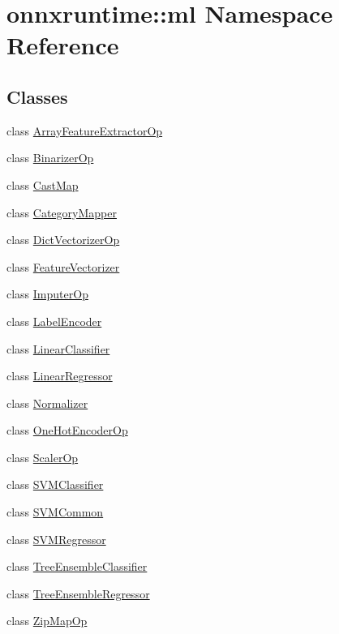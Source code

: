 \hypertarget{namespaceonnxruntime_1_1ml}{}\section{onnxruntime\+:\+:ml Namespace Reference}
\label{namespaceonnxruntime_1_1ml}
\subsection*{Classes}
\begin{DoxyCompactItemize}
\item 
class \mbox{\hyperlink{classonnxruntime_1_1ml_1_1ArrayFeatureExtractorOp}{Array\+Feature\+Extractor\+Op}}
\item 
class \mbox{\hyperlink{classonnxruntime_1_1ml_1_1BinarizerOp}{Binarizer\+Op}}
\item 
class \mbox{\hyperlink{classonnxruntime_1_1ml_1_1CastMap}{Cast\+Map}}
\item 
class \mbox{\hyperlink{classonnxruntime_1_1ml_1_1CategoryMapper}{Category\+Mapper}}
\item 
class \mbox{\hyperlink{classonnxruntime_1_1ml_1_1DictVectorizerOp}{Dict\+Vectorizer\+Op}}
\item 
class \mbox{\hyperlink{classonnxruntime_1_1ml_1_1FeatureVectorizer}{Feature\+Vectorizer}}
\item 
class \mbox{\hyperlink{classonnxruntime_1_1ml_1_1ImputerOp}{Imputer\+Op}}
\item 
class \mbox{\hyperlink{classonnxruntime_1_1ml_1_1LabelEncoder}{Label\+Encoder}}
\item 
class \mbox{\hyperlink{classonnxruntime_1_1ml_1_1LinearClassifier}{Linear\+Classifier}}
\item 
class \mbox{\hyperlink{classonnxruntime_1_1ml_1_1LinearRegressor}{Linear\+Regressor}}
\item 
class \mbox{\hyperlink{classonnxruntime_1_1ml_1_1Normalizer}{Normalizer}}
\item 
class \mbox{\hyperlink{classonnxruntime_1_1ml_1_1OneHotEncoderOp}{One\+Hot\+Encoder\+Op}}
\item 
class \mbox{\hyperlink{classonnxruntime_1_1ml_1_1ScalerOp}{Scaler\+Op}}
\item 
class \mbox{\hyperlink{classonnxruntime_1_1ml_1_1SVMClassifier}{S\+V\+M\+Classifier}}
\item 
class \mbox{\hyperlink{classonnxruntime_1_1ml_1_1SVMCommon}{S\+V\+M\+Common}}
\item 
class \mbox{\hyperlink{classonnxruntime_1_1ml_1_1SVMRegressor}{S\+V\+M\+Regressor}}
\item 
class \mbox{\hyperlink{classonnxruntime_1_1ml_1_1TreeEnsembleClassifier}{Tree\+Ensemble\+Classifier}}
\item 
class \mbox{\hyperlink{classonnxruntime_1_1ml_1_1TreeEnsembleRegressor}{Tree\+Ensemble\+Regressor}}
\item 
class \mbox{\hyperlink{classonnxruntime_1_1ml_1_1ZipMapOp}{Zip\+Map\+Op}}
\end{DoxyCompactItemize}

